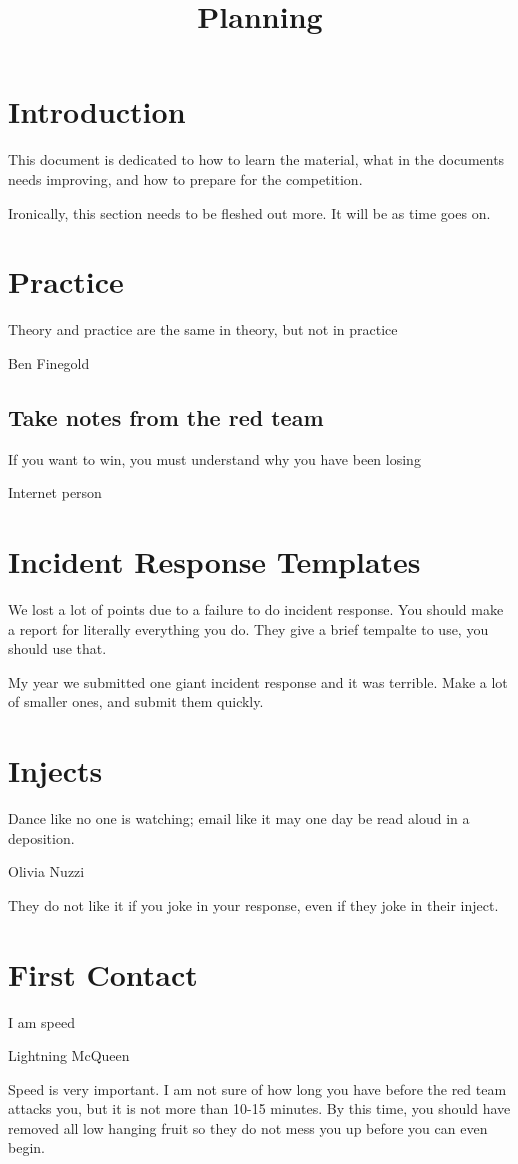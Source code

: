 \documentclass{article}
\begin{document}
\title{Planning}

\graphicspath{ {./Images/} }
\tableofcontents

\section{Introduction}
This document is dedicated to how to learn the material, what in the 
documents needs improving, and how to prepare for the competition.

Ironically, this section needs to be fleshed out more. 
It will be as time goes on.

\section{Practice}
\epigraph{Theory and practice are the same in theory, but not in practice}{Ben Finegold}

\subsection{Take notes from the red team}
\epigraph{If you want to win, you must understand why you have been losing}{Internet person}

\section{Incident Response Templates}
We lost a lot of points due to a failure to do incident response. You should make a report for literally everything you do.
They give a brief tempalte to use, you should use that.

My year we submitted one giant incident response and it was terrible. Make a lot of smaller ones, and submit them quickly.

\section{Injects}
\epigraph{Dance like no one is watching; email like it may one day be read aloud in a deposition.}{Olivia Nuzzi}

They do not like it if you joke in your response, even if they joke in their inject.

\section{First Contact}
\epigraph{I am speed}{Lightning McQueen}

Speed is very important. I am not sure of how long you have before the red team attacks you, but it is not more than 10-15 minutes.
By this time, you should have removed all low hanging fruit so they do not mess you up before you can even begin.
\end{document}
